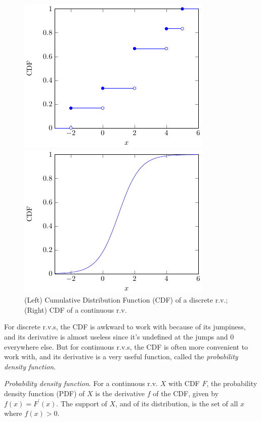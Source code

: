 \begin{figure}[h!]
\centering
\begin{minipage}{.5\textwidth}
  \centering
  \includegraphics{tikz/figure1.pdf}
\end{minipage}%
\begin{minipage}{.5\textwidth}
  \centering
  \includegraphics{tikz/figure2.pdf}
\end{minipage}
\caption{%
(Left) Cumulative Distribution Function (CDF) of a discrete r.v.; 
(Right) CDF of a continuous r.v.}
\end{figure}

For discrete r.v.s, 
the CDF is awkward to work with because of its jumpiness, 
and its derivative is almost useless since it's undefined at 
the jumps and 0 everywhere else. 
But for continuous r.v.s, 
the CDF is often more convenient to work with, 
and its derivative is a very useful function, 
called the \emph{probability density function}.

\emph{Probability density function}. 
For a continuous r.v. \(X\) with CDF \(F\), 
the probability density function (PDF) of \(X\) is the derivative \(f\) of the CDF, 
given by \(f(x) = F^{\prime}(x)\). 
The support of \(X\), and of its distribution, 
is the set of all \(x\) where
\(f(x) > 0\).

